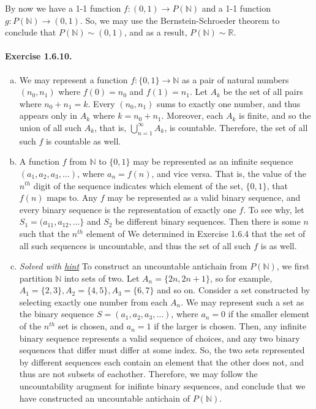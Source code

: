 \documentclass{article}
\newcommand{\N}{\mathbb{N}}
\newcommand{\R}{\mathbb{R}}
\begin{document}
By now we have a 1-1 function $f:(0,1)\to P(\N)$ and a 1-1 function $g:P(\N)\to (0,1)$. So, we may use the Bernstein-Schroeder theorem to conclude that $P(\N)\sim (0,1)$, and as a result, $P(\N)\sim\R$.

\paragraph{Exercise 1.6.10.}
\begin{enumerate}[(a)]
    \item
	We may represent a function $f: \{0,1\}\to \N$ as a pair of natural numbers $(n_0, n_1)$ where $f(0)=n_0$ and $f(1)=n_1$.
	Let $A_k$ be the set of all pairs where $n_0 + n_1 = k$.
	Every $(n_0, n_1)$ sums to exactly one number, and thus appears only in $A_{k}$ where $k=n_0 + n_1$.
	Moreover, each $A_k$ is finite, and so the union of all such $A_k$, that is, $\bigcup_{n=1}^\infty A_k$, is countable.
	Therefore, the set of all such $f$ is countable as well.

	\item 
	A function $f$ from $\N$ to $\{0,1\}$ may be represented as an infinite sequence $(a_1,a_2,a_3,\ldots)$, where $a_n = f(n)$, and vice versa.
	That is, the value of the $n^{th}$ digit of the sequence indicates which element of the set, $\{0,1\}$, that $f(n)$ maps to.
	Any $f$ may be represented as a valid binary sequence, and every binary sequence is the representation of exactly one $f$.
	To see why, let $S_1=(a_{11}, a_{12}, \ldots\}$ and $S_2$ be different binary sequences.
	Then there is some $n$ such that the $n^{th}$ element of 
	We determined in Exercise 1.6.4 that the set of all such sequences is uncountable, and thus the set of all such $f$ is as well.

	\item \textit{Solved with \href{https://math.stackexchange.com/a/4858163/1027565}{hint}}
	To construct an uncountable antichain from $P(\N)$, we first partition $\N$ into sets of two.
	Let $A_n = \{2n, 2n+1\}$, so for example, $A_1 = \{2,3\}, A_2 = \{4, 5\}, A_3 = \{6,7\}$ and so on.
	Consider a set constructed by selecting exactly one number from each $A_n$.
	We may represent such a set as the binary sequence $S=(a_1,a_2,a_3,\ldots)$, where $a_n = 0$ if the smaller element of the $n^{th}$ set is chosen, and $a_n=1$ if the larger is chosen.
	Then, any infinite binary sequence represents a valid sequence of choices, and any two binary sequences that differ must differ at some index.
	So, the two sets represented by different sequences each contain an element that the other does not, and thus are not subsets of eachother.
	Therefore, we may follow the uncountability arugment for inifinte binary sequences, and conclude that we have constructed an uncountable antichain of $P(\N)$.

\end{enumerate}
\end{document}

